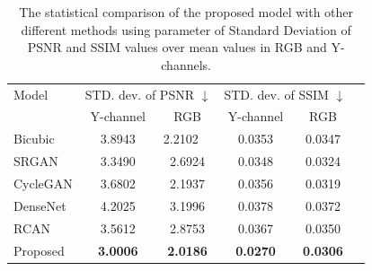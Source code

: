 \documentclass[conference]{IEEEtran}
\begin{document}
\begin{table}[]
\centering
\caption{The statistical comparison of the proposed model with other different methods using parameter of Standard Deviation of PSNR and SSIM values over mean values in RGB and Y-channels.}
\label{table:stanal}
\begin{tabular}{|l|cc|cc|c|}
\hline
Model & \multicolumn{2}{c|}{STD. dev. of PSNR $\downarrow$}                                            & \multicolumn{2}{c|}{STD. dev. of SSIM $\downarrow$}            \\ \cline{2-5} 
                       & \multicolumn{1}{c|}{Y-channel}        & \multicolumn{1}{c|}{RGB}     & \multicolumn{1}{c|}{Y-channel}       & \multicolumn{1}{c|}{RGB} \\ \hline
Bicubic                & \multicolumn{1}{c|}{3.8943}          & \multicolumn{1}{l|}{2.2102} & \multicolumn{1}{c|}{0.0353}          & 0.0347                  \\ \hline
SRGAN \cite{SRGAN}                 & \multicolumn{1}{c|}{3.3490}          & 2.6924                     & \multicolumn{1}{c|}{0.0348}          & 0.0324                                    \\ \hline
CycleGAN \cite{CycleGAN}              & \multicolumn{1}{c|}{3.6802}          & 2.1937                     & \multicolumn{1}{c|}{0.0356}          & 0.0319                                     \\ \hline
DenseNet \cite{SRDensenet}             & \multicolumn{1}{c|}{4.2025}          & 3.1996                      & \multicolumn{1}{c|}{0.0378}          & 0.0372                                    \\ \hline
RCAN  \cite{RCAN}                 & \multicolumn{1}{c|}{3.5612}          & 2.8753                      & \multicolumn{1}{c|}{0.0367}          & 0.0350                                \\ \hline
Proposed               & \multicolumn{1}{c|}{\textbf{3.0006}} & \textbf{2.0186}             & \multicolumn{1}{c|}{\textbf{0.0270}} & \textbf{0.0306}                    \\ \hline
\end{tabular}
\end{table}
\end{document}
